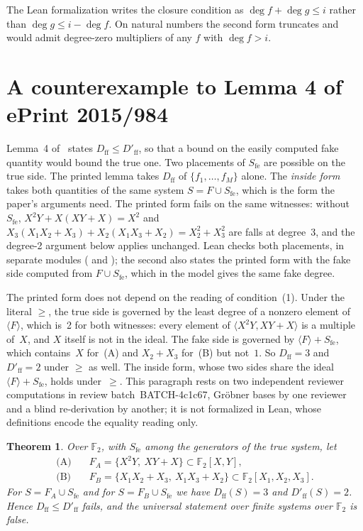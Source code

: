 \documentclass[11pt,a4paper]{article}
\theoremstyle{plain}
\newtheorem{theorem}{Theorem}
\theoremstyle{definition}
\theoremstyle{remark}
\newcommand{\FF}{\mathbb{F}}
\newcommand{\Sfe}{S_{\mathrm{fe}}}
\newcommand{\Dff}{D_{\mathrm{ff}}}
\newcommand{\Dfake}{D'_{\mathrm{ff}}}
\newcommand{\lean}[1]{\path{#1}}
\begin{document}
The Lean formalization writes the closure condition as
$\deg f+\deg g\le i$ rather than $\deg g\le i-\deg f$. On natural numbers the
second form truncates and would admit degree-zero multipliers of any $f$ with
$\deg f>i$.

\section{A counterexample to Lemma 4 of ePrint 2015/984}\label{sec:nagao}

Lemma~4 of~\cite{nagao15} states $\Dff\le\Dfake$, so that a bound on the easily
computed fake quantity would bound the true one. Two placements of $\Sfe$ are
possible on the true side. The printed lemma takes $\Dff$ of
$\{f_1,\dots,f_M\}$ alone. The \emph{inside form} takes both quantities of
the same system $S=F\cup\Sfe$, which is the form the paper's arguments
need. The printed form fails on the same witnesses: without $\Sfe$,
$X^2Y+X(XY+X)=X^2$ and $X_3(X_1X_2+X_3)+X_2(X_1X_3+X_2)=X_2^2+X_3^2$ are falls
at degree~3, and the degree-2 argument below applies unchanged. Lean checks
both placements, in separate modules (\lean{lemma4_inside_false} and
\lean{lemma4_outside_false}); the second also states the printed form with the
fake side computed from $F\cup\Sfe$, which in the model gives the same fake
degree.

The printed form does not depend on the reading of condition~(1). Under the
literal $\ge$, the true side is governed by the least degree of a nonzero
element of $\langle F\rangle$, which is~2 for both witnesses: every element of
$\langle X^2Y, XY+X\rangle$ is a multiple of~$X$, and $X$ itself is not in the
ideal. The fake side is governed by $\langle F\rangle+\Sfe$, which contains~$X$
for~(A) and $X_2+X_3$ for~(B) but not~$1$. So $\Dff=3$ and $\Dfake=2$ under
$\ge$ as well. The inside form, whose two sides share the ideal
$\langle F\rangle+\Sfe$, holds under~$\ge$. This paragraph rests on two
independent reviewer computations in review batch~BATCH-4c1c67, Gr\"obner bases
by one reviewer and a blind re-derivation by another; it is not formalized in
Lean, whose definitions encode the equality reading only.

\begin{theorem}\label{thm:nagao}
Over $\FF_2$, with $\Sfe$ among the generators of the true system, let
\begin{align*}
\text{(A)}\quad & F_A=\{X^2Y,\ XY+X\}\subset\FF_2[X,Y],\\
\text{(B)}\quad & F_B=\{X_1X_2+X_3,\ X_1X_3+X_2\}\subset\FF_2[X_1,X_2,X_3].
\end{align*}
For $S=F_A\cup\Sfe$ and for $S=F_B\cup\Sfe$ we have $\Dff(S)=3$ and
$\Dfake(S)=2$. Hence $\Dff\le\Dfake$ fails, and the universal statement over
finite systems over $\FF_2$ is false.
\end{theorem}
\end{document}
